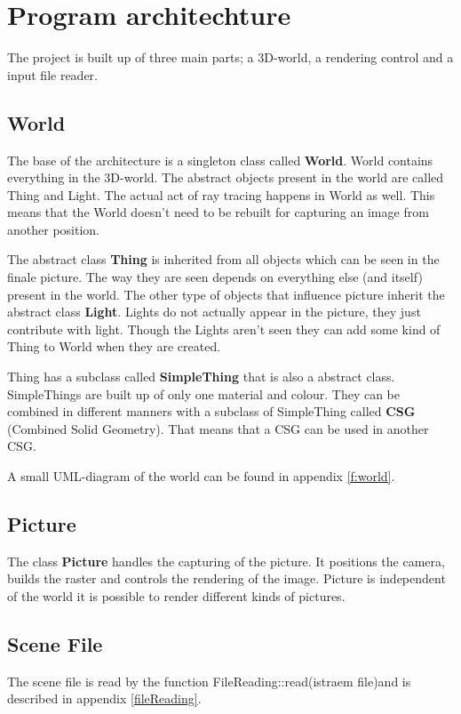 
	
\section{Program architechture}

	
	The project is built up of three main parts; a 3D-world, a rendering control and a input file reader.
	
	\subsection{World}

		The base of the architecture is a singleton class called \textbf{World}. World contains everything in the 3D-world. The abstract objects present in the world are called Thing and Light. The actual act of ray tracing happens in World as well. This means that the World doesn't need to be rebuilt for capturing an image from another position.

		The abstract class \textbf{Thing} is inherited from all objects which can be seen in the finale picture. The way they are seen depends on everything else (and itself) present in the world. The other type of objects that influence picture inherit the abstract class \textbf{Light}. Lights do not actually appear in the picture, they just contribute with light. Though the Lights aren't seen they can add some kind of Thing to World when they are created.

		Thing has a subclass called \textbf{SimpleThing} that is also a abstract class. SimpleThings are built up of only one material and colour. They can be combined in different manners with a subclass of SimpleThing called \textbf{CSG} (Combined Solid Geometry). That means that a CSG can be used in another CSG.

		A small UML-diagram of the world can be found in appendix \ref{f:world}.

	\subsection{Picture}
		The class \textbf{Picture} handles the capturing of the picture. It positions the camera, builds the raster and controls the rendering of the image. Picture is independent of the world it is possible to render different kinds of pictures.

	\subsection{Scene File}
		The scene file is read by the function FileReading::read(istraem file)and is described in appendix \ref{fileReading}.

